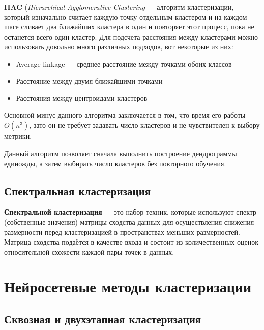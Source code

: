 \begin{definition}
    \textbf{HAC} (\textit{Hierarchical Agglomerative Clustering} --- алгоритм кластеризации, который изначально считает каждую точку отдельным кластером и на каждом шаге сливает два ближайших кластера в один и повторяет этот процесс, пока не останется всего один кластер. Для подсчета расстояния между кластерами можно использовать довольно много различных подходов, вот некоторые из них:
    \begin{itemize}
        \item Average linkage --- среднее расстояние между точками обоих классов
        \item Расстояние между двумя ближайшими точками
        \item Расстояния между центроидами кластеров
    \end{itemize}
\end{definition}

Основной минус данного алгоритма заключается в том, что время его работы $O(n^3)$, зато он не требует задавать число кластеров и не чувствителен к выбору метрики.

\begin{remark}
    Данный алгоритм позволяет сначала выполнить построение дендрограммы единожды, а затем выбирать число кластеров без повторного обучения.
\end{remark}

\subsection{Спектральная кластеризация}

\begin{definition}
    \textbf{Спектральной кластеризация} --- это набор техник, которые используют спектр (собственные значения) матрицы сходства данных для осуществления снижения размерности перед кластеризацией в пространствах меньших размерностей. Матрица сходства подаётся в качестве входа и состоит из количественных оценок относительной схожести каждой пары точек в данных.
\end{definition}

\section{Нейросетевые методы кластеризации}

\subsection{Сквозная и двухэтапная кластеризация}

